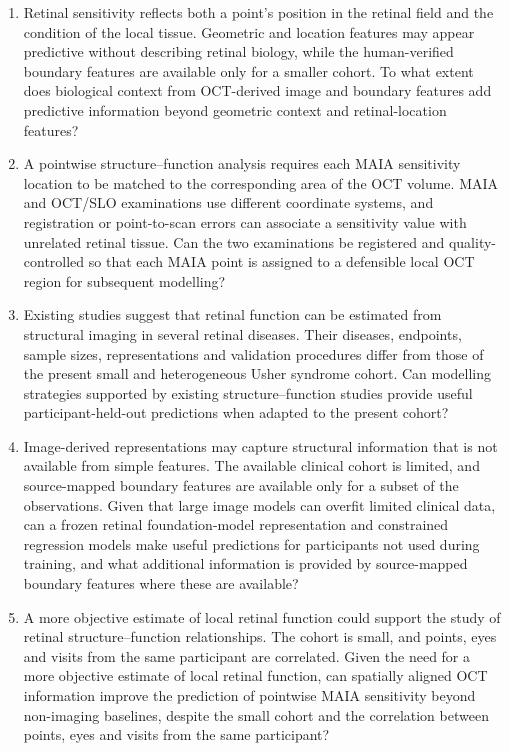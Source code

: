 \begin{enumerate}[label=\textbf{RQ\arabic*.},leftmargin=*]
  \item Retinal sensitivity reflects both a point's position in the retinal field and the condition of the local tissue. Geometric and location features may appear predictive without describing retinal biology, while the human-verified boundary features are available only for a smaller cohort. To what extent does biological context from OCT-derived image and boundary features add predictive information beyond geometric context and retinal-location features?

  \item A pointwise structure--function analysis requires each MAIA sensitivity location to be matched to the corresponding area of the OCT volume. MAIA and OCT/SLO examinations use different coordinate systems, and registration or point-to-scan errors can associate a sensitivity value with unrelated retinal tissue. Can the two examinations be registered and quality-controlled so that each MAIA point is assigned to a defensible local OCT region for subsequent modelling?

  \item Existing studies suggest that retinal function can be estimated from structural imaging in several retinal diseases. Their diseases, endpoints, sample sizes, representations and validation procedures differ from those of the present small and heterogeneous Usher syndrome cohort. Can modelling strategies supported by existing structure--function studies provide useful participant-held-out predictions when adapted to the present cohort?

  \item Image-derived representations may capture structural information that is not available from simple features. The available clinical cohort is limited, and source-mapped boundary features are available only for a subset of the observations. Given that large image models can overfit limited clinical data, can a frozen retinal foundation-model representation and constrained regression models make useful predictions for participants not used during training, and what additional information is provided by source-mapped boundary features where these are available?

  \item A more objective estimate of local retinal function could support the study of retinal structure--function relationships. The cohort is small, and points, eyes and visits from the same participant are correlated. Given the need for a more objective estimate of local retinal function, can spatially aligned OCT information improve the prediction of pointwise MAIA sensitivity beyond non-imaging baselines, despite the small cohort and the correlation between points, eyes and visits from the same participant?
\end{enumerate}

